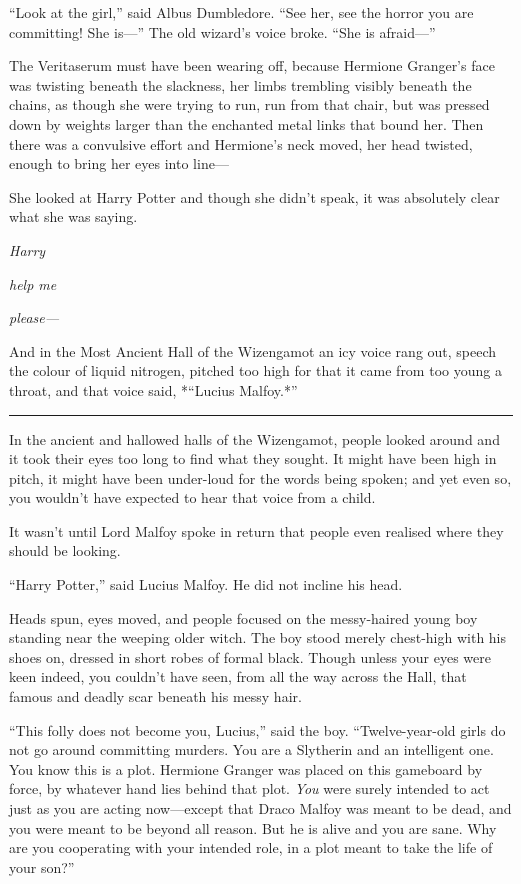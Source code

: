 ``Look at the girl,'' said Albus Dumbledore. ``See her, see the horror
you are committing! She is---'' The old wizard's voice broke. ``She is
afraid---''

The Veritaserum must have been wearing off, because Hermione Granger's
face was twisting beneath the slackness, her limbs trembling visibly
beneath the chains, as though she were trying to run, run from that
chair, but was pressed down by weights larger than the enchanted metal
links that bound her. Then there was a convulsive effort and Hermione's
neck moved, her head twisted, enough to bring her eyes into line---

She looked at Harry Potter and though she didn't speak, it was
absolutely clear what she was saying.

\emph{Harry}

\emph{help me}

\emph{please---}

And in the Most Ancient Hall of the Wizengamot an icy voice rang out,
speech the colour of liquid nitrogen, pitched too high for that it came
from too young a throat, and that voice said, *``Lucius Malfoy.*''

\begin{center}\rule{3in}{0.4pt}\end{center}

In the ancient and hallowed halls of the Wizengamot, people looked
around and it took their eyes too long to find what they sought. It
might have been high in pitch, it might have been under-loud for the
words being spoken; and yet even so, you wouldn't have expected to hear
that voice from a child.

It wasn't until Lord Malfoy spoke in return that people even realised
where they should be looking.

``Harry Potter,'' said Lucius Malfoy. He did not incline his head.

Heads spun, eyes moved, and people focused on the messy-haired young boy
standing near the weeping older witch. The boy stood merely chest-high
with his shoes on, dressed in short robes of formal black. Though unless
your eyes were keen indeed, you couldn't have seen, from all the way
across the Hall, that famous and deadly scar beneath his messy hair.

``This folly does not become you, Lucius,'' said the boy.
``Twelve-year-old girls do not go around committing murders. You are a
Slytherin and an intelligent one. You know this is a plot. Hermione
Granger was placed on this gameboard by force, by whatever hand lies
behind that plot. \emph{You} were surely intended to act just as you are
acting now---except that Draco Malfoy was meant to be dead, and you were
meant to be beyond all reason. But he is alive and you are sane. Why are
you cooperating with your intended role, in a plot meant to take the
life of your son?''

